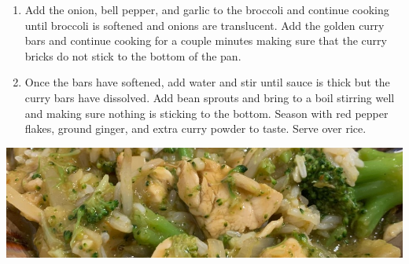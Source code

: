 \begin{multicols}{2}
\begin{enumerate}
\item Add the onion, bell pepper, and garlic to the broccoli and continue cooking until broccoli is softened and onions are translucent. Add the golden curry bars and continue cooking for a couple minutes making sure that the curry bricks do not stick to the bottom of the pan.
\newline 

 \item Once the bars have softened, add water and stir until sauce is thick but the curry bars have dissolved. Add bean sprouts and bring to a boil stirring well and making sure nothing is sticking to the bottom. Season with red pepper flakes, ground ginger, and extra curry powder to taste. Serve over rice.  
\end{enumerate}

\end{multicols}



\begin{center}
\includegraphics[scale=0.55]{Chicken Recipes/Curry Stir Fry/Curry Stir Fry.jpg}
\end{center}


